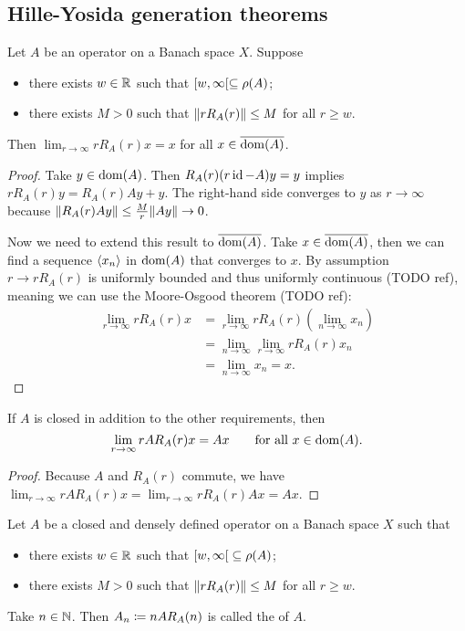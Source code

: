 \subsection{Hille-Yosida generation theorems}
\begin{lemma} \label{resolventLimitLemma}
Let $A$ be an operator on a Banach space $X$. Suppose
\begin{itemize}
\item there exists $w\in \mathbb{R}$ such that $[w,\infty[ \subseteq \rho(A)$;
\item there exists $M>0$ such that $\lVert r R_A(r)\rVert\leq M$ for all $r \geq w$.
\end{itemize}
Then $\lim_{r\to \infty} r R_A(r)x = x$ for all $x\in \overline{\operatorname{dom}(A)}$.
\end{lemma}
\begin{proof}
Take $y\in \operatorname{dom}(A)$. Then $R_A(r)(r\operatorname{id} - A)y = y$ implies $r R_A(r)y = R_A(r)Ay + y$. The right-hand side converges to $y$ as $r\to\infty$ because $\lVert R_A(r)Ay\rVert \leq \frac{M}{r}\lVert Ay\rVert \to 0$.

Now we need to extend this result to $\overline{\operatorname{dom}(A)}$. Take $x\in \overline{\operatorname{dom}(A)}$, then we can find a sequence $\left\langle x_n \right\rangle$ in $\operatorname{dom}(A)$ that converges to $x$. By assumption $r \to r R_A(r)$ is uniformly bounded and thus uniformly continuous (TODO ref), meaning we can use the Moore-Osgood theorem (TODO ref):
\begin{align*}
\lim_{r\to \infty} r R_A(r)x &= \lim_{r\to \infty} r R_A(r)\left(\lim_{n\to\infty}x_n\right) \\
&= \lim_{n\to\infty}\lim_{r\to \infty} r R_A(r)x_n \\
&= \lim_{n\to\infty}x_n = x.
\end{align*}
\end{proof}
\begin{corollary} \label{YosidaApproximantsLemma}
If $A$ is closed in addition to the other requirements, then
\[ \lim_{r\to \infty} r AR_A(r)x = Ax \qquad \text{for all $x\in \operatorname{dom}(A)$.} \]
\end{corollary}
\begin{proof}
Because $A$ and $R_A(r)$ commute, we have $\lim_{r\to \infty} r AR_A(r)x = \lim_{r\to \infty} r R_A(r)Ax =Ax$.
\end{proof}

\begin{definition}
Let $A$ be a closed and densely defined operator on a Banach space $X$ such that
\begin{itemize}
\item there exists $w\in \mathbb{R}$ such that $\interval[co]{w,\infty} \subseteq \res(A)$;
\item there exists $M>0$ such that $\lVert r R_A(r)\rVert\leq M$ for all $r \geq w$.
\end{itemize}
Take $n\in \mathbb{N}$. Then $A_n \coloneqq nAR_A(n)$ is called the  of $A$.
\end{definition}

